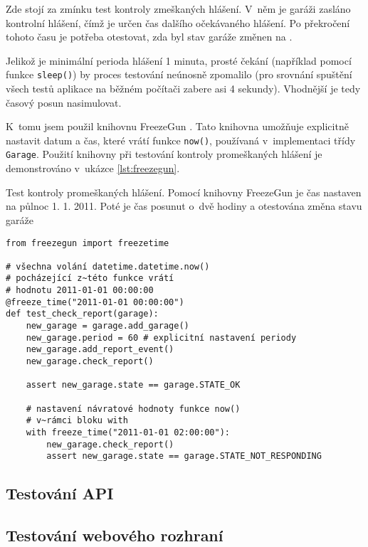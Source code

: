 Zde stojí za zmínku test kontroly zmeškaných hlášení. V~něm je garáži zasláno kontrolní hlášení, čímž je určen čas dalšího očekávaného hlášení. Po překročení tohoto času je potřeba otestovat, zda byl stav garáže změnen na .

Jelikož je minimální perioda hlášení 1 minuta, prosté čekání (například pomocí funkce \texttt{sleep()}) by proces testování neúnosně zpomalilo (pro srovnání spuštění všech testů aplikace na běžném počítači zabere asi 4 sekundy). Vhodnější je tedy časový posun nasimulovat.

K~tomu jsem použil knihovnu FreezeGun \cite{freezegun}. Tato knihovna umožňuje explicitně nastavit datum a čas, které vrátí funkce \texttt{now()}, používaná v~implementaci třídy \texttt{Garage}. Použití knihovny při testování kontroly promeškaných hlášení je demonstrováno v~ukázce \ref{lst:freezegun}.

\begin{listing}[htbp]
\caption{\label{lst:freezegun} Test kontroly promeškaných hlášení. Pomocí knihovny FreezeGun je čas nastaven na půlnoc 1. 1. 2011. Poté je čas posunut o~dvě hodiny a otestována změna stavu garáže}
\begin{verbatim}
from freezegun import freezetime

# všechna volání datetime.datetime.now()
# pocházející z~této funkce vrátí
# hodnotu 2011-01-01 00:00:00
@freeze_time("2011-01-01 00:00:00")
def test_check_report(garage):
    new_garage = garage.add_garage()
    new_garage.period = 60 # explicitní nastavení periody
    new_garage.add_report_event()
    new_garage.check_report()

    assert new_garage.state == garage.STATE_OK

    # nastavení návratové hodnoty funkce now()
    # v~rámci bloku with
    with freeze_time("2011-01-01 02:00:00"):
        new_garage.check_report()
        assert new_garage.state == garage.STATE_NOT_RESPONDING
\end{verbatim}
\end{listing}

\subsection{Testování API}

\subsection{Testování webového rozhraní}

